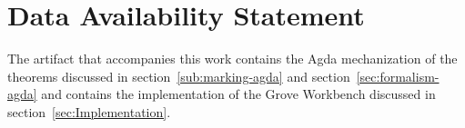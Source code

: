 













\section*{Data Availability Statement}
The artifact \cite{grove-artifact} that accompanies this work contains the Agda mechanization of the theorems discussed in section~\ref{sub:marking-agda} and section~\ref{sec:formalism-agda} and contains the implementation of the Grove Workbench discussed in section~\ref{sec:Implementation}.
